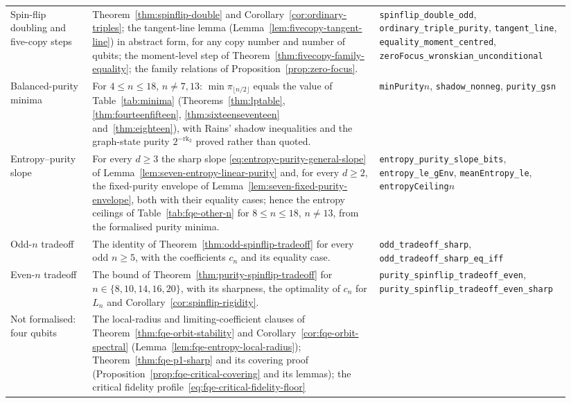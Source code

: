{\begin{longtable}{@{}>{\raggedright\arraybackslash}p{0.14\linewidth}>{\raggedright\arraybackslash}p{0.49\linewidth}>{\raggedright\arraybackslash}p{0.31\linewidth}@{}}
Spin-flip doubling and five-copy steps &
Theorem~\ref{thm:spinflip-double} and Corollary~\ref{cor:ordinary-triples}; the tangent-line lemma
(Lemma~\ref{lem:fivecopy-tangent-line}) in abstract form, for any copy number and number of qubits; the moment-level step of
Theorem~\ref{thm:fivecopy-family-equality}; the family relations of Proposition~\ref{prop:zero-focus}. &
\texttt{spinflip\_double\_odd}, \texttt{ordinary\_\allowbreak triple\_purity}, \texttt{tangent\_line}, \texttt{equality\_\allowbreak moment\_centred},
\texttt{zeroFocus\_\allowbreak wronskian\_\allowbreak unconditional}\\
Balanced-purity minima &
For $4\le n\le18$, $n\ne7,13$: $\min\pi_{\lfloor n/2\rfloor}$ equals the value of Table~\ref{tab:minima}
(Theorems~\ref{thm:lptable}, \ref{thm:fourteenfifteen}, \ref{thm:sixteenseventeen} and~\ref{thm:eighteen}), with
Rains' shadow inequalities and the graph-state purity $2^{-\mathrm{rk}_2}$ proved rather than quoted. &
\texttt{minPurity}$n$, \texttt{shadow\_nonneg}, \texttt{purity\_gsn}\\
Entropy--purity slope &
For every $d\ge3$ the sharp slope \eqref{eq:entropy-purity-general-slope} of Lemma~\ref{lem:seven-entropy-linear-purity} and,
for every $d\ge2$, the fixed-purity envelope of Lemma~\ref{lem:seven-fixed-purity-envelope}, both with their equality
cases; hence the entropy ceilings of Table~\ref{tab:fqe-other-n} for $8\le n\le18$, $n\ne13$, from the formalised purity minima. &
\texttt{entropy\_purity\_slope\_bits}, \texttt{entropy\_le\_gEnv}, \texttt{meanEntropy\_le}, \texttt{entropyCeiling}$n$\\
Odd-$n$ tradeoff &
The identity of Theorem~\ref{thm:odd-spinflip-tradeoff} for every odd $n\ge5$, with the coefficients $c_n$ and its
equality case. &
\texttt{odd\_tradeoff\_sharp}, \texttt{odd\_tradeoff\_sharp\_eq\_iff}\\
Even-$n$ tradeoff &
The bound of Theorem~\ref{thm:purity-spinflip-tradeoff} for $n\in\{8,10,14,16,20\}$, with its sharpness, the optimality of
$c_n$ for $L_n$ and Corollary~\ref{cor:spinflip-rigidity}. &
\texttt{purity\_spinflip\_\allowbreak tradeoff\_even}, \texttt{purity\_spinflip\_\allowbreak tradeoff\_even\_sharp}\\
\midrule
Not formalised: four qubits &
The local-radius and limiting-coefficient clauses of Theorem~\ref{thm:fqe-orbit-stability} and
Corollary~\ref{cor:fqe-orbit-spectral} (Lemma~\ref{lem:fqe-entropy-local-radius}); Theorem~\ref{thm:fqe-p1-sharp} and its covering
proof (Proposition~\ref{prop:fqe-critical-covering} and its lemmas); the critical fidelity profile~\eqref{eq:fqe-critical-fidelity-floor}

\end{longtable}}
